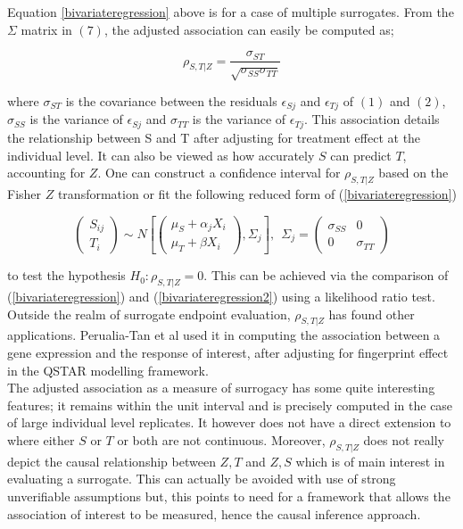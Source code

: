 \documentclass[a4paper,12pt]{article}
\begin{document}
	Equation \ref{bivariateregression} above is for a case of multiple surrogates. From the $\Sigma$ matrix in $(7)$, the adjusted association\citep{surrogate1,surrogate2} can easily be computed as;
	
	\begin{equation}
	\rho_{S,T|Z} = \frac{\sigma_{ST}}{\sqrt{\sigma_{SS} \sigma_{TT} }}
	\end{equation}
	
	where $\sigma_{ST}$ is the covariance between the residuals $\epsilon_{Sj}$ and $\epsilon_{Tj}$ of $(1)$ and $(2)$, $\sigma_{SS}$ is the variance of $\epsilon_{Sj}$ and $\sigma_{TT}$ is the variance of $\epsilon_{Tj}$. This association details the relationship between S and T after adjusting for treatment effect\citep{surrogate1,surrogate2,buyseM} at the individual level. It can also be viewed as how accurately $S$ can predict $T$, accounting for $Z$\citep{surrogate3}. One can construct a confidence interval for $\rho_{S,T|Z}$ based on the Fisher $Z$ transformation\citep{surrogate1} or fit the following reduced form of (\ref{bivariateregression})
	
	\begin{equation}\label{bivariateregression2}
	\left( \begin{array}{c}
	S_{ij} \\
	T_{i}
	\end{array} \right) \sim N\left[ \left( \begin{array}{c}
	\mu_{S} + \alpha_jX_i  \\
	\mu_{T} + \beta X_i
	\end{array}
	\right), \Sigma_j \right], \ \ \Sigma_j = \left( \begin{array}{cc}
	\sigma_{SS} & 0\\
	0 & \sigma_{TT}
	\end{array}\right)
	\end{equation}
	
	to test the hypothesis $H_0: \rho_{S,T|Z} = 0$. This can be achieved via the comparison of (\ref{bivariateregression}) and (\ref{bivariateregression2}) using a likelihood ratio test\citep{surrogate1}. Outside the realm of surrogate endpoint evaluation, $\rho_{S,T|Z}$ has found other applications. Perualia-Tan et al\citep{nolen2016} used it in computing the association between a gene expression and the response of interest, after adjusting for fingerprint effect in the QSTAR modelling framework\citep{surrogate1}.\\
	
	The adjusted association as a measure of surrogacy has  some quite interesting features; it remains within the unit interval and is precisely computed in the case of large individual level replicates. It however does not have a direct extension to where either $S$ or $T$ or both are not continuous\citep{surrogate1,surrogate2,buyseM}. Moreover, $\rho_{S,T|Z}$ does not really depict the causal relationship between $Z, T$ and $Z, S$ which is of main interest in evaluating a surrogate\citep{wim2016}. This can actually be avoided with use of strong unverifiable assumptions but, this points to need for a framework that allows the association of interest to be measured, hence the causal inference approach\citep{surrogate3}. 
	
\end{document}
